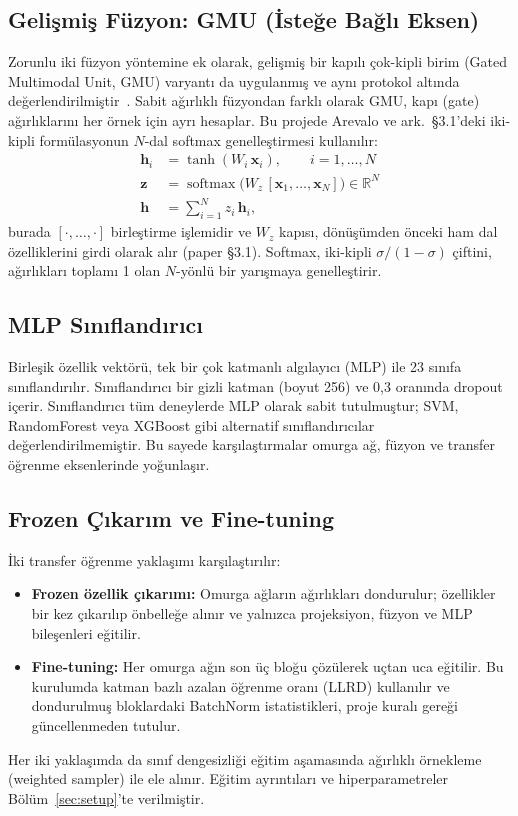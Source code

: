 \subsection{Gelişmiş Füzyon: GMU (İsteğe Bağlı Eksen)}
\label{subsec:gmu}
Zorunlu iki füzyon yöntemine ek olarak, gelişmiş bir kapılı çok-kipli birim
(Gated Multimodal Unit, GMU) varyantı da uygulanmış ve aynı protokol altında
değerlendirilmiştir~\cite{arevalo2017gmu}. Sabit ağırlıklı füzyondan farklı
olarak GMU, kapı (gate) ağırlıklarını her örnek için ayrı hesaplar. Bu projede
Arevalo ve ark.\ §3.1'deki iki-kipli formülasyonun $N$-dal softmax
genelleştirmesi kullanılır:
\begin{align}
  \mathbf{h}_i &= \tanh(W_i\,\mathbf{x}_i), \qquad i = 1,\dots,N \\
  \mathbf{z}   &= \operatorname{softmax}\!\big(W_z\,[\mathbf{x}_1,\dots,\mathbf{x}_N]\big) \in \mathbb{R}^{N} \\
  \mathbf{h}   &= \sum_{i=1}^{N} z_i\,\mathbf{h}_i ,
\end{align}
burada $[\cdot,\dots,\cdot]$ birleştirme işlemidir ve $W_z$ kapısı, dönüşümden
önceki ham dal özelliklerini girdi olarak alır (paper §3.1). Softmax, iki-kipli
$\sigma/(1-\sigma)$ çiftini, ağırlıkları toplamı 1 olan $N$-yönlü bir yarışmaya
genelleştirir.

\subsection{MLP Sınıflandırıcı}
\label{subsec:mlp}
Birleşik özellik vektörü, tek bir çok katmanlı algılayıcı (MLP) ile 23 sınıfa
sınıflandırılır. Sınıflandırıcı bir gizli katman (boyut 256) ve 0,3 oranında
dropout içerir. Sınıflandırıcı tüm deneylerde MLP olarak sabit tutulmuştur;
SVM, RandomForest veya XGBoost gibi alternatif sınıflandırıcılar
değerlendirilmemiştir. Bu sayede karşılaştırmalar omurga ağ,
füzyon ve transfer öğrenme eksenlerinde yoğunlaşır.

\subsection{Frozen Çıkarım ve Fine-tuning}
\label{subsec:transfer}
İki transfer öğrenme yaklaşımı karşılaştırılır:
\begin{itemize}
  \item \textbf{Frozen özellik çıkarımı:} Omurga ağların ağırlıkları
        dondurulur; özellikler bir kez çıkarılıp önbelleğe alınır ve yalnızca
        projeksiyon, füzyon ve MLP bileşenleri eğitilir.
  \item \textbf{Fine-tuning:} Her omurga ağın son üç bloğu çözülerek uçtan uca
        eğitilir. Bu kurulumda katman bazlı azalan öğrenme oranı (LLRD)
        kullanılır ve dondurulmuş bloklardaki BatchNorm istatistikleri,
        proje kuralı gereği güncellenmeden tutulur.
\end{itemize}
Her iki yaklaşımda da sınıf dengesizliği eğitim aşamasında ağırlıklı örnekleme
(weighted sampler) ile ele alınır. Eğitim ayrıntıları ve hiperparametreler
Bölüm~\ref{sec:setup}'te verilmiştir.


